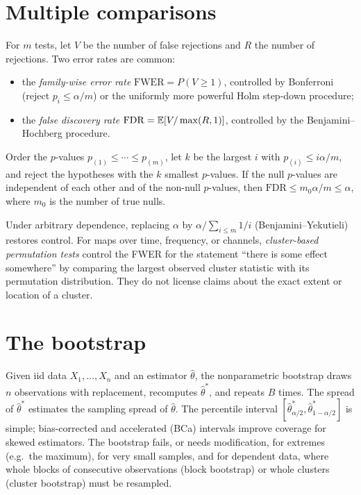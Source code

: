 \section{Multiple comparisons}
For $m$ tests, let $V$ be the number of false rejections and $R$ the number of rejections. Two error rates are common:
\begin{itemize}[leftmargin=2em]
\item the \emph{family-wise error rate} $\mathrm{FWER}=P(V\ge1)$, controlled by Bonferroni (reject $p_i\le\alpha/m$) or the uniformly more powerful Holm step-down procedure;
\item the \emph{false discovery rate} $\mathrm{FDR}=\mathbb E[V/\max(R,1)]$, controlled by the Benjamini--Hochberg procedure.
\end{itemize}
\begin{theorem}
Order the $p$-values $p_{(1)}\le\cdots\le p_{(m)}$, let $k$ be the largest $i$ with $p_{(i)}\le i\alpha/m$, and reject the hypotheses with the $k$ smallest $p$-values. If the null $p$-values are independent of each other and of the non-null $p$-values, then $\mathrm{FDR}\le m_0\alpha/m\le\alpha$, where $m_0$ is the number of true nulls.
\end{theorem}
Under arbitrary dependence, replacing $\alpha$ by $\alpha/\sum_{i\le m}1/i$ (Benjamini--Yekutieli) restores control. For maps over time, frequency, or channels, \emph{cluster-based permutation tests} control the FWER for the statement ``there is some effect somewhere'' by comparing the largest observed cluster statistic with its permutation distribution. They do not license claims about the exact extent or location of a cluster.

\section{The bootstrap}
Given iid data $X_1,\ldots,X_n$ and an estimator $\hat\theta$, the nonparametric bootstrap draws $n$ observations with replacement, recomputes $\hat\theta^\ast$, and repeats $B$ times. The spread of $\hat\theta^\ast$ estimates the sampling spread of $\hat\theta$. The percentile interval $[\hat\theta^\ast_{\alpha/2},\hat\theta^\ast_{1-\alpha/2}]$ is simple; bias-corrected and accelerated (BCa) intervals improve coverage for skewed estimators. The bootstrap fails, or needs modification, for extremes (e.g.\ the maximum), for very small samples, and for dependent data, where whole blocks of consecutive observations (block bootstrap) or whole clusters (cluster bootstrap) must be resampled.

